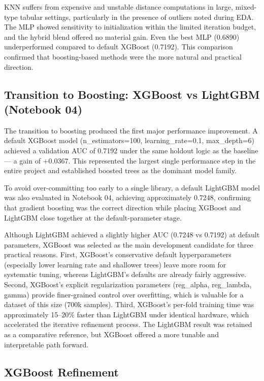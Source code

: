 \documentclass[a4paper,11pt]{article}
\begin{document}
KNN suffers from expensive and unstable distance computations in large, mixed-type tabular settings, particularly in the presence of outliers noted during EDA. The MLP showed sensitivity to initialization within the limited iteration budget, and the hybrid blend offered no material gain. Even the best MLP (0.6890) underperformed compared to default XGBoost (0.7192). This comparison confirmed that boosting-based methods were the more natural and practical direction.

\subsection{Transition to Boosting: XGBoost vs LightGBM (Notebook 04)}

The transition to boosting produced the first major performance improvement. A default XGBoost model (n\_estimators=100, learning\_rate=0.1, max\_depth=6) achieved a validation AUC of 0.7192 under the same holdout logic as the baseline --- a gain of +0.0367. This represented the largest single performance step in the entire project and established boosted trees as the dominant model family.

To avoid over-committing too early to a single library, a default LightGBM model was also evaluated in Notebook 04, achieving approximately 0.7248, confirming that gradient boosting was the correct direction while placing XGBoost and LightGBM close together at the default-parameter stage.

Although LightGBM achieved a slightly higher AUC (0.7248 vs 0.7192) at default parameters, XGBoost was selected as the main development candidate for three practical reasons. First, XGBoost's conservative default hyperparameters (especially lower learning rate and shallower trees) leave more room for systematic tuning, whereas LightGBM's defaults are already fairly aggressive. Second, XGBoost's explicit regularization parameters (reg\_alpha, reg\_lambda, gamma) provide finer-grained control over overfitting, which is valuable for a dataset of this size (700k samples). Third, XGBoost's per-fold training time was approximately 15--20\% faster than LightGBM under identical hardware, which accelerated the iterative refinement process. The LightGBM result was retained as a comparative reference, but XGBoost offered a more tunable and interpretable path forward.

\subsection{XGBoost Refinement}
\end{document}

